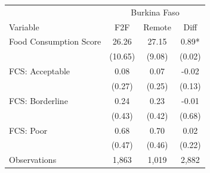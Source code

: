 \begin{tabular}{l*{3}c}
\hline\hline
 & \multicolumn{3}{c}{Burkina Faso}\\ 
Variable & F2F & Remote & Diff \\
\hline
Food Consumption Score&26.26&27.15&0.89*\\
&(10.65)&(9.08)&(0.02)\\
FCS: Acceptable&0.08&0.07&-0.02\\
&(0.27)&(0.25)&(0.13)\\
FCS: Borderline&0.24&0.23&-0.01\\
&(0.43)&(0.42)&(0.68)\\
FCS: Poor&0.68&0.70&0.02\\
&(0.47)&(0.46)&(0.22)\\
\hline
Observations & 1,863 & 1,019 & 2,882 \\
\hline\hline
\end{tabular}
